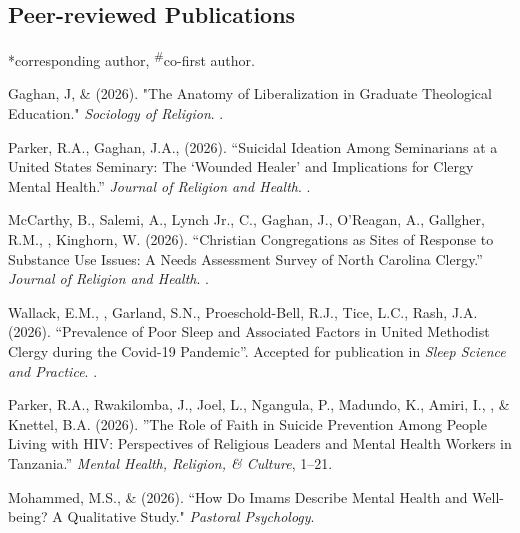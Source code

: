 \newcommand{\Revision}{\textit{under revision}}
\newcommand{\CS}{*} %
\newcommand{\CF}{\textsuperscript{\#}} %

\subsection*{Peer-reviewed Publications}
\CS corresponding author, \CF co-first author.

\begin{etaremune}
\item Gaghan, J, \& \Eagle \hspace{0.3em} (2026). "The Anatomy of Liberalization in Graduate Theological Education." \textit{Sociology of Religion}. .

\item Parker, R.A., Gaghan, J.A., \Eagle \hspace{.1em} (2026). ``Suicidal Ideation Among Seminarians at a United States Seminary: The ‘Wounded Healer’ and Implications for Clergy Mental Health.'' \textit{Journal of Religion and Health}. .

\item McCarthy, B., Salemi, A., Lynch Jr., C., Gaghan, J., O'Reagan, A., Gallgher, R.M., \Eagle, Kinghorn, W. (2026). ``Christian Congregations as Sites of Response to Substance Use Issues: A Needs Assessment Survey of North Carolina Clergy.'' \textit{Journal of Religion and Health}. .

\item Wallack, E.M., \Eagle, Garland, S.N., Proeschold-Bell, R.J., Tice, L.C., Rash, J.A. (2026). ``Prevalence of Poor Sleep and Associated Factors in United Methodist Clergy during the Covid-19 Pandemic''. Accepted for publication in \textit{Sleep Science and Practice}. .

\item Parker, R.A., Rwakilomba, J., Joel, L., Ngangula, P., Madundo, K., Amiri, I., \Eagle, \& Knettel, B.A. (2026). ''The Role of Faith in Suicide Prevention Among People Living with HIV: Perspectives of Religious Leaders and Mental Health Workers in Tanzania.'' \textit{Mental Health, Religion, \& Culture}, 1–21. 
	
\item Mohammed, M.S., \& \Eagle \hspace{.1em} (2026). ``How Do Imams Describe Mental Health and Well-being? A Qualitative Study." \textit{Pastoral Psychology}. 


\end{etaremune}
